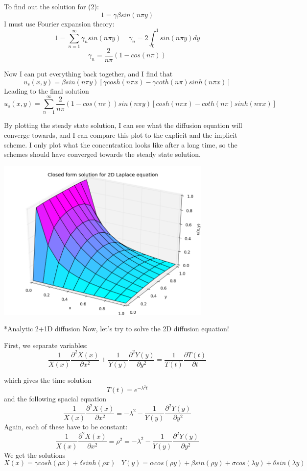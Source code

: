 \documentclass[a4paper, 12pt, titlepage]{article}
\newcommand{\f}[2]{\frac{#1}{#2}}
\newcommand{\beq}{\begin{equation*}}
\newcommand{\eeq}{\end{equation*}}
\newcommand{\beqq}{\begin{equation}}
\newcommand{\eeqq}{\end{equation}}
\newcommand{\pa}{\partial}
\begin{document}
\begin{section}
\begin{subsection}
  To find out the solution for (2):
  \beq 1 = \gamma \beta sin(n\pi y) \eeq
  I must use Fourier expansion theory:
  \beq 1 = \sum_{n=1}^{\infty} \gamma_n sin(n\pi y) \;\;\;\; \gamma_n = 2\int_0^1 sin(n\pi y) dy \eeq 
  \beq \gamma_n = \frac{2}{n\pi}(1 - cos(n\pi)) \eeq 
  
  Now I can put everything back together, and I find that
  \beq u_s(x,y) = \beta sin(n\pi y) [\gamma cosh(n\pi x) - \gamma coth(n\pi) sinh(n\pi x)] \eeq
  Leading to the final solution
  \beqq u_s(x,y) = \sum_{n=1}^{\infty} \frac{2}{n\pi}(1-cos(n\pi)) sin(n\pi y) [cosh(n\pi x) - coth(n\pi) sinh(n\pi x)] \eeqq
  
  By plotting the steady state solution, I can see what the diffusion equation will converge towards, and 
  I can compare this plot to the explicit and the implicit scheme. I only plot what the concentration looks
  like after a long time, so the schemes should have converged towards the steady state solution.
  
  \includegraphics[width=0.8\textwidth]{build-main-Desktop-Debug/SteadyState.png}
 
  \end{subsection}
  
  \begin{subsection}*{Analytic 2+1D diffusion}
   Now, let's try to solve the 2D diffusion equation! 
   
   First, we separate variables:
   \beq \f{1}{X(x)} \f{\pa^2 X(x)}{\pa x^2} + \f{1}{Y(y)} \f{\pa^2 Y(y)}{\pa y^2} = \f{1}{T(t)} \f{\pa T(t)}{\pa t}\eeq 
   
   which gives the time solution \beqq T(t) = e^{-\lambda ^2 t} \eeqq
   and the following spacial equation
   \beq \f{1}{X(x)} \f{\pa^2 X(x)}{\pa x^2} = -\lambda ^2 - \f{1}{Y(y)} \f{\pa^2 Y(y)}{\pa y^2} \eeq
   Again, each of these have to be constant:
   \beq \f{1}{X(x)} \f{\pa^2 X(x)}{\pa x^2} = \rho ^2 = -\lambda ^2 - \f{1}{Y(y)} \f{\pa^2 Y(y)}{\pa y^2} \eeq
   We get the solutions
   \beq X(x) = \gamma cosh(\rho x) + \delta sinh(\rho x) \;\;\;
   Y(y) = \alpha cos(\rho y) + \beta sin(\rho y) + \sigma cos(\lambda y) + \theta sin(\lambda y) \eeq
   

\end{subsection}
\end{section}
\end{document}
